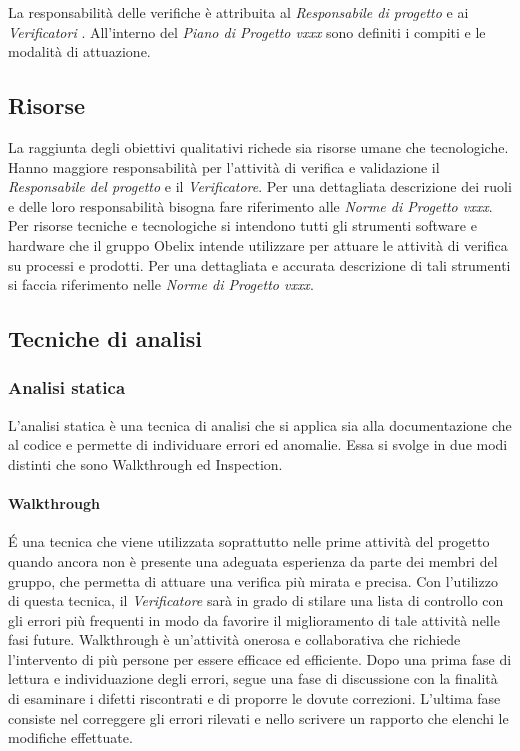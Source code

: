 La responsabilità delle verifiche è attribuita al  \emph{Responsabile di
progetto} e ai  \emph{Verificatori} . All'interno del  \emph{Piano di Progetto vxxx}  sono definiti i compiti e le modalità di attuazione.

\subsection{Risorse}
La raggiunta degli obiettivi qualitativi richede sia risorse umane che tecnologiche. Hanno maggiore responsabilità per l'attività di verifica e validazione il \emph{Responsabile del progetto} e il \emph{Verificatore}. Per una dettagliata descrizione dei ruoli e delle loro responsabilità bisogna fare riferimento alle \emph{Norme di Progetto vxxx}. Per risorse tecniche e tecnologiche si intendono tutti gli strumenti software e hardware che il gruppo Obelix intende utilizzare per attuare le attività di verifica su processi e prodotti. Per una dettagliata e accurata descrizione di tali strumenti si faccia riferimento nelle \emph{Norme di Progetto vxxx}.


\subsection{Tecniche di analisi}

\subsubsection{Analisi statica}
L’analisi statica è una tecnica di analisi che si applica sia alla documentazione che al codice e permette di individuare errori ed anomalie. Essa si svolge in due modi distinti che sono Walkthrough ed Inspection.

\paragraph{Walkthrough}
\'E una tecnica che viene utilizzata soprattutto nelle prime attività del progetto quando ancora non è presente una adeguata esperienza da parte dei membri del gruppo, che permetta di attuare una verifica più mirata e precisa.
Con l’utilizzo di questa tecnica, il \emph{Verificatore} sarà in grado di stilare una lista di controllo con gli errori più frequenti in modo da favorire il miglioramento di tale attività nelle fasi future.
Walkthrough è un’attività onerosa e collaborativa che richiede l’intervento di più persone per essere efficace ed efficiente. Dopo una prima fase di lettura e individuazione degli errori, segue una fase di discussione con la finalità di esaminare i difetti riscontrati e di proporre le dovute correzioni. L’ultima fase consiste nel correggere gli errori rilevati e nello scrivere un rapporto che elenchi le modifiche effettuate.


